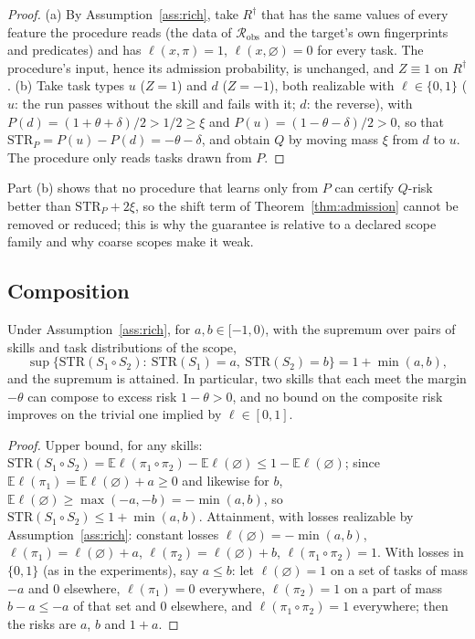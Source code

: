 \begin{proof}
(a) By Assumption~\ref{ass:rich}, take $R^\dagger$ that has the same values of every feature the procedure reads (the data
of $\mathcal{R}_{\mathrm{obs}}$ and the target's own fingerprints and predicates) and has $\ell(x,\pi)=1$, $\ell(x,\varnothing)=0$
for every task.  The procedure's input, hence its admission probability, is unchanged, and $Z\equiv1$ on $R^\dagger$.
(b) Take task types $u$ ($Z=1$) and $d$ ($Z=-1$), both realizable with $\ell\in\{0,1\}$ ($u$: the run passes without the
skill and fails with it; $d$: the reverse), with $P(d)=(1+\theta+\delta)/2>1/2\ge\xi$ and $P(u)=(1-\theta-\delta)/2>0$, so that
$\mathrm{STR}_P=P(u)-P(d)=-\theta-\delta$, and obtain $Q$ by moving mass $\xi$ from
$d$ to $u$.  The procedure only reads tasks drawn from $P$.
\end{proof}

Part (b) shows that no procedure that learns only from $P$ can certify $Q$-risk better than $\mathrm{STR}_P+2\xi$, so the shift
term of Theorem~\ref{thm:admission} cannot be removed or reduced; this is why the guarantee is relative to a declared scope
family and why coarse scopes make it weak.

\subsection{Composition}

\begin{theorem}\label{thm:composition}
Under Assumption~\ref{ass:rich}, for $a,b\in[-1,0)$, with the supremum over pairs of skills and task distributions of the scope,
\[
  \sup\bigl\{\mathrm{STR}(S_1\circ S_2):\ \mathrm{STR}(S_1)=a,\ \mathrm{STR}(S_2)=b\bigr\}=1+\min(a,b),
\]
and the supremum is attained.  In particular, two skills that each meet the margin $-\theta$ can compose to excess risk
$1-\theta>0$, and no bound on the composite risk improves on the trivial one implied by $\ell\in[0,1]$.
\end{theorem}

\begin{proof}
Upper bound, for any skills: $\mathrm{STR}(S_1\circ S_2)=\mathbb{E}\ell(\pi_1\circ\pi_2)-\mathbb{E}\ell(\varnothing)\le1-\mathbb{E}\ell(\varnothing)$;
since $\mathbb{E}\ell(\pi_1)=\mathbb{E}\ell(\varnothing)+a\ge0$ and likewise for $b$, $\mathbb{E}\ell(\varnothing)\ge\max(-a,-b)=-\min(a,b)$, so
$\mathrm{STR}(S_1\circ S_2)\le1+\min(a,b)$.  Attainment, with losses realizable by Assumption~\ref{ass:rich}: constant losses
$\ell(\varnothing)=-\min(a,b)$, $\ell(\pi_1)=\ell(\varnothing)+a$, $\ell(\pi_2)=\ell(\varnothing)+b$, $\ell(\pi_1\circ\pi_2)=1$.  With losses in
$\{0,1\}$ (as in the experiments), say $a\le b$: let $\ell(\varnothing)=1$ on a set of tasks of mass $-a$ and $0$ elsewhere, $\ell(\pi_1)=0$
everywhere, $\ell(\pi_2)=1$ on a part of mass $b-a\le-a$ of that set and $0$ elsewhere, and $\ell(\pi_1\circ\pi_2)=1$ everywhere; then the
risks are $a$, $b$ and $1+a$.
\end{proof}

